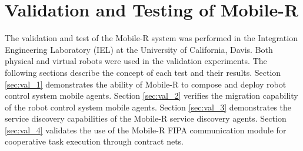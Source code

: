 \chapter{Validation and Testing of Mobile-R} \label{sec:validation}

  The validation and test of the Mobile-R system was performed in the 
    Integration Engineering Laboratory (IEL) at the University of California, 
    Davis.
  Both physical and virtual robots were used in the validation experiments.
  The following sections describe the concept of each test and their 
    results.
  Section \ref{sec:val_1} demonstrates the ability of Mobile-R to compose and
    deploy robot control system mobile agents.
  Section \ref{sec:val_2} verifies the migration capability of the robot
    control system mobile agents.
  Section \ref{sec:val_3} demonstrates the service discovery capabilities of
    the Mobile-R service discovery agents.
  Section \ref{sec:val_4} validates the use of the Mobile-R FIPA 
    communication module for cooperative task execution through contract nets.

